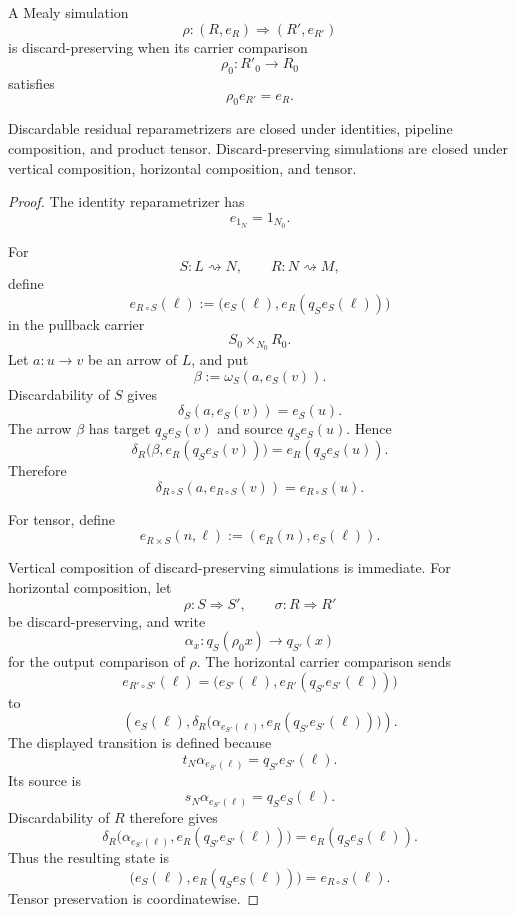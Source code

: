 \begin{definition}
\label{def:discard-preserving-simulation}
A Mealy simulation
\[
  \rho:(R,e_R)\Longrightarrow(R',e_{R'})
\]
is discard-preserving when its carrier comparison
\[
  \rho_0:R'_0\to R_0
\]
satisfies
\[
  \rho_0e_{R'}=e_R.
\]
\end{definition}

\begin{proposition}
\label{prop:discardable-closure}
Discardable residual reparametrizers are closed under identities, pipeline composition, and product
tensor. Discard-preserving simulations are closed under vertical composition, horizontal
composition, and tensor.
\end{proposition}

\begin{proof}
The identity reparametrizer has
\[
  e_{1_N}=1_{N_0}.
\]

For
\[
  S:L\rightsquigarrow N,
  \qquad
  R:N\rightsquigarrow M,
\]
define
\[
  e_{R\circ S}(\ell)
  :=
  \bigl(
    e_S(\ell),
    e_R(q_Se_S(\ell))
  \bigr)
\]
in the pullback carrier
\[
  S_0\times_{N_0}R_0.
\]
Let \(a:u\to v\) be an arrow of \(L\), and put
\[
  \beta:=\omega_S(a,e_S(v)).
\]
Discardability of \(S\) gives
\[
  \delta_S(a,e_S(v))=e_S(u).
\]
The arrow \(\beta\) has target \(q_Se_S(v)\) and source \(q_Se_S(u)\). Hence
\[
  \delta_R
  \bigl(
    \beta,
    e_R(q_Se_S(v))
  \bigr)
  =
  e_R(q_Se_S(u)).
\]
Therefore
\[
  \delta_{R\circ S}
  (a,e_{R\circ S}(v))
  =
  e_{R\circ S}(u).
\]

For tensor, define
\[
  e_{R\times S}(n,\ell)
  :=
  (e_R(n),e_S(\ell)).
\]

Vertical composition of discard-preserving simulations is immediate. For horizontal composition,
let
\[
  \rho:S\Longrightarrow S',
  \qquad
  \sigma:R\Longrightarrow R'
\]
be discard-preserving, and write
\[
  \alpha_x:
  q_S(\rho_0x)\longrightarrow q_{S'}(x)
\]
for the output comparison of \(\rho\). The horizontal carrier comparison sends
\[
  e_{R'\circ S'}(\ell)
  =
  \bigl(
    e_{S'}(\ell),
    e_{R'}(q_{S'}e_{S'}(\ell))
  \bigr)
\]
to
\[
  \left(
    e_S(\ell),
    \delta_R
    \bigl(
      \alpha_{e_{S'}(\ell)},
      e_R(q_{S'}e_{S'}(\ell))
    \bigr)
  \right).
\]
The displayed transition is defined because
\[
  t_N\alpha_{e_{S'}(\ell)}
  =
  q_{S'}e_{S'}(\ell).
\]
Its source is
\[
  s_N\alpha_{e_{S'}(\ell)}
  =
  q_Se_S(\ell).
\]
Discardability of \(R\) therefore gives
\[
  \delta_R
  \bigl(
    \alpha_{e_{S'}(\ell)},
    e_R(q_{S'}e_{S'}(\ell))
  \bigr)
  =
  e_R(q_Se_S(\ell)).
\]
Thus the resulting state is
\[
  \bigl(
    e_S(\ell),
    e_R(q_Se_S(\ell))
  \bigr)
  =
  e_{R\circ S}(\ell).
\]
Tensor preservation is coordinatewise.
\end{proof}

